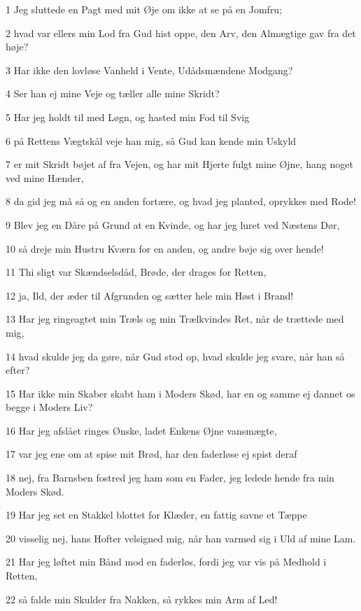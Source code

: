 \par 1 Jeg sluttede en Pagt med mit Øje om ikke at se på en Jomfru;
\par 2 hvad var ellers min Lod fra Gud hist oppe, den Arv, den Almægtige gav fra det høje?
\par 3 Har ikke den lovløse Vanheld i Vente, Udådsmændene Modgang?
\par 4 Ser han ej mine Veje og tæller alle mine Skridt?
\par 5 Har jeg holdt til med Løgn, og hasted min Fod til Svig
\par 6 på Rettens Vægtskål veje han mig, så Gud kan kende min Uskyld
\par 7 er mit Skridt bøjet af fra Vejen, og har mit Hjerte fulgt mine Øjne, hang noget ved mine Hænder,
\par 8 da gid jeg må så og en anden fortære, og hvad jeg planted, oprykkes med Rode!
\par 9 Blev jeg en Dåre på Grund at en Kvinde, og har jeg luret ved Næstens Dør,
\par 10 så dreje min Hustru Kværn for en anden, og andre bøje sig over hende!
\par 11 Thi sligt var Skændselsdåd, Brøde, der drages for Retten,
\par 12 ja, Ild, der æder til Afgrunden og sætter hele min Høst i Brand!
\par 13 Har jeg ringeagtet min Træls og min Trælkvindes Ret, når de trættede med mig,
\par 14 hvad skulde jeg da gøre, når Gud stod op, hvad skulde jeg svare, når han så efter?
\par 15 Har ikke min Skaber skabt ham i Moders Skød, har en og samme ej dannet os begge i Moders Liv?
\par 16 Har jeg afslået ringes Ønske, ladet Enkens Øjne vansmægte,
\par 17 var jeg ene om at spise mit Brød, har den faderløse ej spist deraf
\par 18 nej, fra Barnsben fostred jeg ham som en Fader, jeg ledede hende fra min Moders Skød.
\par 19 Har jeg set en Stakkel blottet for Klæder, en fattig savne et Tæppe
\par 20 visselig nej, hans Hofter velsigned mig, når han varmed sig i Uld af mine Lam.
\par 21 Har jeg løftet min Bånd mod en faderløs, fordi jeg var vis på Medhold i Retten,
\par 22 så falde min Skulder fra Nakken, så rykkes min Arm af Led!

